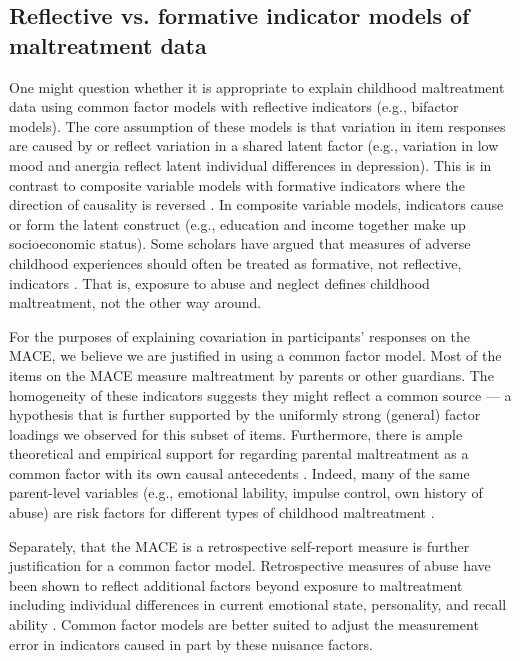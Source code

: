 \documentclass[letterpaper,man,natbib,longtable,floatsintext,12pt]{apa6}
\begin{document}
\setcounter{figure}{0}
\setcounter{table}{0}
\renewcommand{\thetable}{S\arabic{table}}
\renewcommand{\thefigure}{S\arabic{figure}}

\subsection*{Reflective vs. formative indicator models of maltreatment data}

One might question whether it is appropriate to explain childhood maltreatment data using common factor models with reflective indicators (e.g., bifactor models). The core assumption of these models is that variation in item responses are caused by or reflect variation in a shared latent factor (e.g., variation in low mood and anergia reflect latent individual differences in depression). This is in contrast to composite variable models with formative indicators where the direction of causality is reversed . In composite variable models, indicators cause or form the latent construct (e.g., education and income together make up socioeconomic status). Some scholars have argued that measures of adverse childhood experiences should often be treated as formative, not reflective, indicators . That is, exposure to abuse and neglect defines childhood maltreatment, not the other way around. 

For the purposes of explaining covariation in participants' responses on the MACE, we believe we are justified in using a common factor model. Most of the items on the MACE measure maltreatment by parents or other guardians. The homogeneity of these indicators suggests they might reflect a common source --- a hypothesis that is further supported by the uniformly strong (general) factor loadings we observed for this subset of items. Furthermore, there is ample theoretical and empirical support for regarding parental maltreatment as a common factor with its own causal antecedents . Indeed, many of the same parent-level variables (e.g., emotional lability, impulse control, own history of abuse) are risk factors for different types of childhood maltreatment . 

Separately, that the MACE is a retrospective self-report measure is further justification for a common factor model. Retrospective measures of abuse have been shown to reflect additional factors beyond exposure to maltreatment including individual differences in current emotional state, personality, and recall ability . Common factor models are better suited to adjust the measurement error in indicators caused in part by these nuisance factors.
\end{document}
